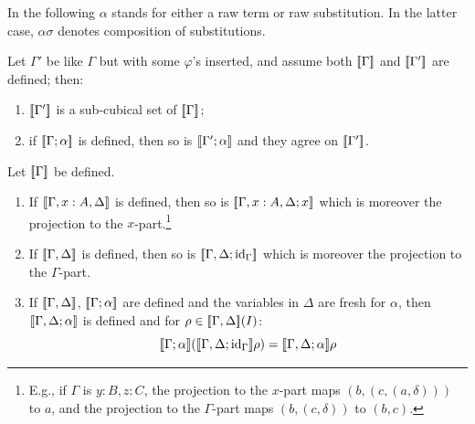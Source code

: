 In the following $\alpha$ stands for either a raw term or raw
substitution.  In the latter case, $\alpha \sigma$ denotes composition
of substitutions.
\begin{lemma}
  \label{lem:face-weakening}
  Let $\Gamma'$ be like $\Gamma$ but with some $\varphi$'s inserted,
  and assume both $[\![\Gamma]\!]$ and $[\![\Gamma']\!]$ are defined;
  then:
  \begin{enumerate}
  \item $[\![\Gamma']\!]$ is a sub-cubical set of $[\![\Gamma]\!]$;
  \item if $[\![\Gamma;\alpha]\!]$ is defined, then so is
    $[\![\Gamma';\alpha]\!]$ and they agree on $[\![\Gamma']\!]$.
  \end{enumerate}
\end{lemma}

\begin{lemma}[Weakening]
  \label{lem:weakening}
  Let $[\![\Gamma]\!]$ be defined.
  \begin{enumerate}
  \item If $[\![\Gamma,x:A,\Delta]\!]$ is defined, then so is
    $[\![\Gamma,x:A,\Delta;x]\!]$ which is moreover the projection to
    the $x$-part.\footnote{E.g., if $\Gamma$ is $y:B,z:C$, the
      projection to the $x$-part maps $(b,(c,(a,\delta)))$ to $a$, and
      the projection to the $\Gamma$-part maps $(b,(c,\delta))$ to
      $(b,c)$.}
  \item If $[\![\Gamma,\Delta]\!]$ is defined, then so is
    $[\![\Gamma,\Delta;\mathrm{id}_\Gamma]\!]$ which is moreover the projection
    to the $\Gamma$-part.
  \item If $[\![\Gamma,\Delta]\!]$, $[\![\Gamma;\alpha]\!]$ are defined
    and the variables in $\Delta$ are fresh for $\alpha$, then
    $[\![\Gamma,\Delta;\alpha]\!]$ is defined and for $\rho \in
    [\![\Gamma,\Delta]\!] (I)$:
    \[
    [\![\Gamma;\alpha]\!] ([\![\Gamma,\Delta; \mathrm{id}_\Gamma]\!] \rho) =
    [\![\Gamma,\Delta;\alpha]\!] \rho
    \]
  \end{enumerate}
\end{lemma}

